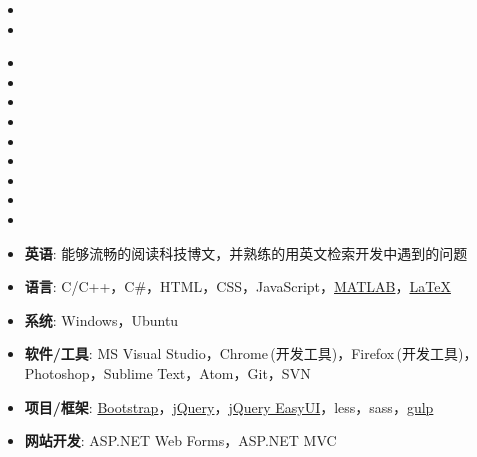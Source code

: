 \documentclass[letterpaper,11pt]{article}
\begin{document}
  \begin{itemize}[leftmargin=*]
    \item
    \item
  \end{itemize}

  \begin{itemize}[leftmargin=*]
    \item {}
    \item {}
    \item {}
    \item {}
    \item {}
    \item {}
    \item {}
    \item {}
    \item {}
  \end{itemize}

  \begin{itemize}[leftmargin=*]
    \item \textbf{英语}: 能够流畅的阅读科技博文，并熟练的用英文检索开发中遇到的问题
    \item \textbf{语言}: C/C++，C\#，HTML，CSS，JavaScript，\href{http://cn.mathworks.com/products/matlab/}{MATLAB}，\href{http://www.latex-project.org/}{\LaTeX}
    \item \textbf{系统}: Windows，Ubuntu
    \item \textbf{软件/工具}: MS Visual Studio，Chrome$\,$(开发工具)，Firefox$\,$(开发工具)，Photoshop，Sublime Text，Atom，Git，SVN
    \item \textbf{项目/框架}: \href{http://www.bootcss.com/}{Bootstrap}，\href{https://jquery.com/}{jQuery}，\href{http://jeasyui.com/}{jQuery EasyUI}，less，sass，\href{http://gulpjs.com/}{gulp}
    \item \textbf{网站开发}: ASP.NET Web Forms，ASP.NET MVC
  \end{itemize}
\end{document}
